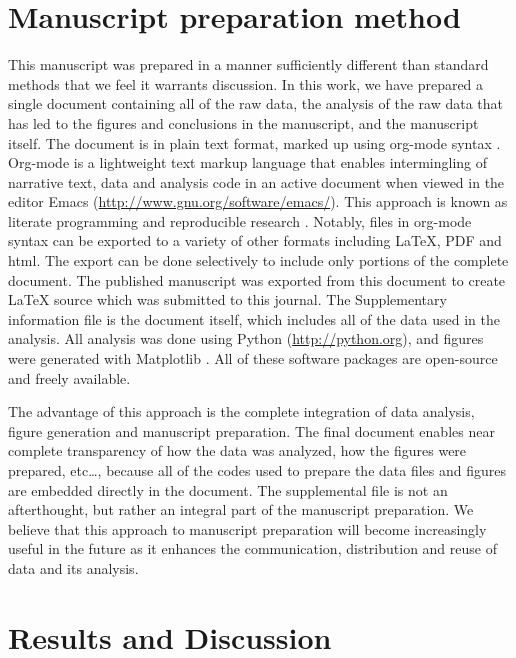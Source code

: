 \documentclass{svjour3}
\begin{document}
\section{Manuscript preparation method}
\label{sec:org850d84f}
This manuscript was prepared in a manner sufficiently different than standard methods that we feel it warrants discussion. In this work, we have prepared a single document containing all of the raw data, the analysis of the raw data that has led to the figures and conclusions in the manuscript, and the manuscript itself. The document is in plain text format, marked up using org-mode syntax \cite{Dominik2010}. Org-mode is a lightweight text markup language that enables intermingling of narrative text, data and analysis code in an active document \cite{5756277} when viewed in the editor Emacs (\url{http://www.gnu.org/software/emacs/}). This approach is known as literate programming and reproducible research \cite{v46i03}. Notably, files in org-mode syntax can be exported to a variety of other formats including \LaTeX{}, PDF and html. The export can be done selectively to include only portions of the complete document. The published manuscript was exported from this document to create \LaTeX{} source which was submitted to this journal. The Supplementary information file is the document itself, which includes all of the data used in the analysis. All analysis was done using Python (\url{http://python.org}), and figures were generated with Matplotlib \cite{Hunter:2007}. All of these software packages are open-source and freely available.

The advantage of this approach is the complete integration of data analysis, figure generation and manuscript preparation. The final document enables near complete transparency of how the data was analyzed, how the figures were prepared, etc\ldots{}, because all of the codes used to prepare the data files and figures are embedded directly in the document. The supplemental file is not an afterthought, but rather an integral part of the manuscript preparation. We believe that this approach to manuscript preparation will become increasingly useful in the future as it enhances the communication, distribution and reuse of data and its analysis.

\section{Results and Discussion}
\label{sec:org711284a}
\end{document}

